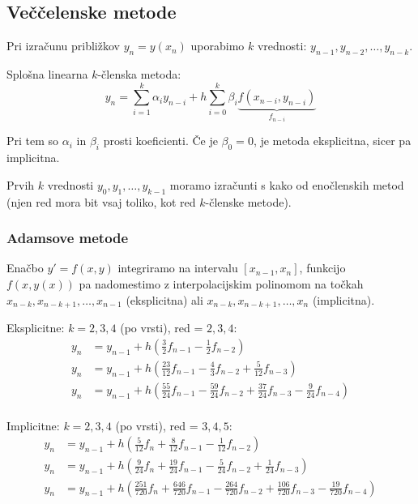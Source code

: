 \begin{multicols}{5}
\subsection*{Veččelenske metode}
Pri izračunu približkov $y_n = y(x_n)$ uporabimo $k$ vrednosti: $y_{n-1}, y_{n-2}, \dots, y_{n-k}$.

Splošna linearna $k$-členska metoda:
\[ y_n = \sum_{i=1}^k \alpha_i y_{n-i} + h \sum_{i=0}^k \beta_i \underbrace{f(x_{n-i}, y_{n-i})}_{f_{n-i}} \]

Pri tem so $\alpha_i$ in $\beta_i$ prosti koeficienti. Če je $\beta_0 = 0$, je metoda eksplicitna, sicer pa implicitna.

Prvih $k$ vrednosti $y_0, y_1, \dots, y_{k-1}$ moramo izračunti s kako od enočlenskih metod (njen red mora bit vsaj toliko, kot red $k$-členske metode).

\subsubsection*{Adamsove metode}
Enačbo $y' = f(x,y)$ integriramo na intervalu $[x_{n-1}, x_n]$, funkcijo $f(x, y(x))$ pa nadomestimo z interpolacijskim
polinomom na točkah $x_{n-k}, x_{n-k+1}, \dots, x_{n-1}$ (eksplicitna) ali  $x_{n-k}, x_{n-k+1}, \dots, x_{n}$ (implicitna).

Eksplicitne: $k = 2, 3, 4$ (po vrsti), red = $2, 3, 4$:
\begin{align*}
    y_n &= y_{n-1} + h\left( \frac{3}{2} f_{n-1} - \frac{1}{2} f_{n-2}\right) \\
    y_n &= y_{n-1} + h\left( \frac{23}{12} f_{n-1} - \frac{4}{3} f_{n-2} + \frac{5}{12}f_{n-3}\right) \\
    y_n &= y_{n-1} + h\left( \frac{55}{24} f_{n-1} - \frac{59}{24} f_{n-2} + \frac{37}{24}f_{n-3} - \frac{9}{24} f_{n-4}\right) \\
\end{align*}

Implicitne: $k = 2, 3, 4$ (po vrsti), red = $3, 4, 5$:
\begin{align*}
    y_n &= y_{n-1} + h\left( \frac{5}{12} f_{n} + \frac{8}{12} f_{n-1} - \frac{1}{12} f_{n-2}\right) \\
    y_n &= y_{n-1} + h\left( \frac{9}{24} f_{n} + \frac{19}{24} f_{n-1} - \frac{5}{24} f_{n-2} + \frac{1}{24}f_{n-3}\right) \\
    y_n &= y_{n-1} + {\scriptstyle h\left( \frac{251}{720} f_{n} + \frac{646}{720} f_{n-1} - \frac{264}{720} f_{n-2} + \frac{106}{720}f_{n-3} - \frac{19}{720} f_{n-4}\right) }
\end{align*}


\end{multicols}
